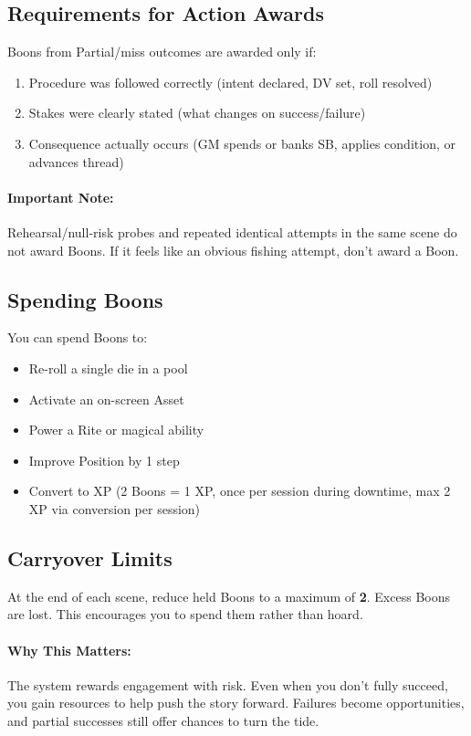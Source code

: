 \subsection*{Requirements for Action Awards}
Boons from Partial/miss outcomes are awarded only if:
\begin{enumerate}
\item Procedure was followed correctly (intent declared, DV set, roll resolved)
\item Stakes were clearly stated (what changes on success/failure)
\item Consequence actually occurs (GM spends or banks SB, applies condition, or advances thread)
\end{enumerate}

\paragraph{Important Note:}
Rehearsal/null-risk probes and repeated identical attempts in the same scene do not award Boons. If it feels like an obvious fishing attempt, don't award a Boon.

\subsection*{Spending Boons}
You can spend Boons to:
\begin{itemize}
\item Re-roll a single die in a pool
\item Activate an on-screen Asset
\item Power a Rite or magical ability
\item Improve Position by 1 step
\item Convert to XP (2 Boons = 1 XP, once per session during downtime, max 2 XP via conversion per session)
\end{itemize}

\subsection*{Carryover Limits}
At the end of each scene, reduce held Boons to a maximum of \textbf{2}. Excess Boons are lost. This encourages you to spend them rather than hoard.

\paragraph{Why This Matters:}
The system rewards engagement with risk. Even when you don't fully succeed, you gain resources to help push the story forward. Failures become opportunities, and partial successes still offer chances to turn the tide.

